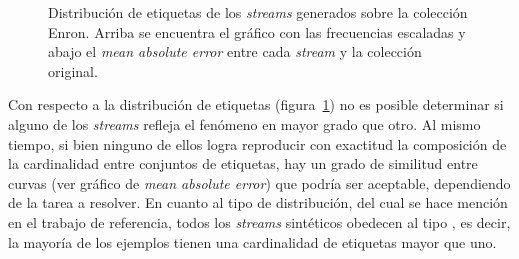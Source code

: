 \begin{figure}
	\centering
	\qquad
	\bigskip
	\bigskip
	\caption[Distribución de etiquetas de los \textit{streams} generados sobre la colección
		Enron.]{Distribución de etiquetas de los \textit{streams} generados sobre la colección
		Enron. Arriba se encuentra el gráfico con las frecuencias escaladas y
		abajo el \textit{mean absolute error} entre cada \textit{stream} y la
		colección original.}
	\label{fig:syn_enron_label_distribution}
\end{figure}

Con respecto a la distribución de etiquetas
(figura~\ref{fig:syn_enron_label_distribution}) no es posible determinar si
alguno de los \textit{streams} refleja el fenómeno en mayor grado que otro. Al
mismo tiempo, si bien ninguno de ellos logra reproducir con exactitud la
composición de la cardinalidad entre conjuntos de etiquetas, hay un grado de
similitud entre curvas (ver gráfico de \textit{mean absolute error}) que podría
ser aceptable, dependiendo de la tarea a resolver. En cuanto al tipo de
distribución, del cual se hace mención en el trabajo de referencia, todos los
\textit{streams} sintéticos obedecen al tipo , es decir, la mayoría
de los ejemplos tienen una cardinalidad de etiquetas mayor que uno.

